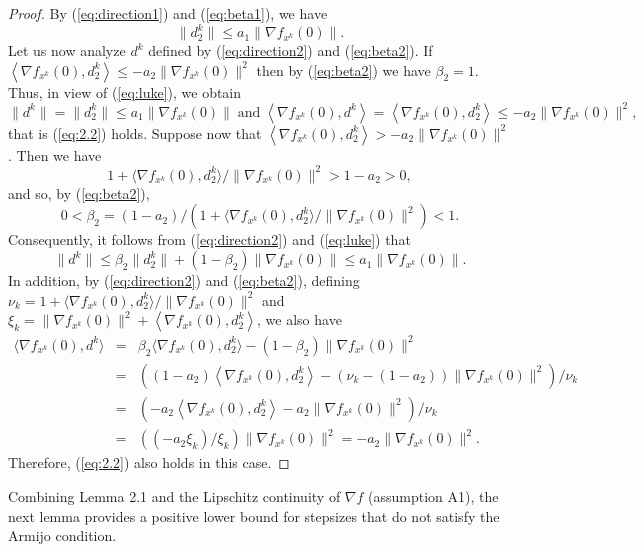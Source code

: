 \documentclass[11pt]{article}
\begin{document}
\begin{proof}
By (\ref{eq:direction1}) and (\ref{eq:beta1}), we have
\begin{equation} \label{eq:luke}
\|d_{2}^{k}\|\leq a_{1}\|\nabla f_{x^{k}}(0)\|.
\end{equation}
Let us now analyze $d^{k}$ defined by (\ref{eq:direction2}) and (\ref{eq:beta2}). If $\left\langle\nabla f_{x^{k}}(0),d_{2}^{k}\right\rangle\leq-a_{2}\|\nabla f_{x^{k}}(0)\|^{2}$ then by (\ref{eq:beta2}) we have $\beta_{2}=1$. Thus, in view of (\ref{eq:luke}), we obtain
\[
\|d^{k}\|=\|d_{2}^{k}\|\leq a_{1}\|\nabla f_{x^{k}}(0)\|\;\text{and}\;\left\langle\nabla f_{x^{k}}(0),d^{k}\right\rangle=\left\langle\nabla f_{x^{k}}(0),d_{2}^{k}\right\rangle\leq -a_{2}\|\nabla f_{x^{k}}(0)\|^{2},
\]
that is (\ref{eq:2.2}) holds. Suppose now that $\left\langle\nabla f_{x^{k}}(0),d_{2}^{k}\right\rangle>-a_{2}\|\nabla f_{x^{k}}(0)\|^{2}$. Then we have
\[
1 + \langle \nabla f_{x^{k}}(0),d_{2}^{k} \rangle / \| \nabla f_{x^{k}}(0) \|^{2} > 1 - a_{2} > 0,
\]
and so, by (\ref{eq:beta2}), 
\[
0<\beta_{2}=(1-a_{2}) / \left(1+\langle\nabla f_{x^{k}}(0),d_{2}^{k}\rangle / \|\nabla f_{x^{k}}(0)\|^{2}\right) <1.
\]
Consequently, it follows from (\ref{eq:direction2}) and (\ref{eq:luke}) that
\[
\|d^{k}\|\leq\beta_{2}\|d_{2}^{k}\|+(1-\beta_{2})\|\nabla f_{x^{k}}(0)\|\leq a_{1}\|\nabla f_{x^{k}}(0)\|.
\]
In addition, by (\ref{eq:direction2}) and (\ref{eq:beta2}), defining $\nu_k = 1+\langle\nabla f_{x^{k}}(0),d_{2}^{k}\rangle / \|\nabla f_{x^{k}}(0)\|^{2}$ and $\xi_k = \|\nabla f_{x^{k}}(0)\|^{2}+\left\langle\nabla f_{x^{k}}(0),d_{2}^{k}\right\rangle$, we also have
\begin{eqnarray*}
\langle\nabla f_{x^{k}}(0),d^{k}\rangle
&=& \beta_{2}\langle\nabla f_{x^{k}}(0),d_{2}^{k}\rangle-(1-\beta_{2})\|\nabla f_{x^{k}}(0)\|^{2}\\
&=&\left((1-a_{2})\left\langle\nabla f_{x^{k}}(0),d_{2}^{k}\right\rangle-\left(\nu_k-(1-a_{2})\right)\|\nabla f_{x^{k}}(0)\|^{2}\right) / \nu_k\\
&=&\left(-a_{2}\left\langle\nabla f_{x^{k}}(0),d_{2}^{k}\right\rangle-a_{2}\|\nabla f_{x^{k}}(0)\|^{2}\right) / \nu_k\\
&=&\left((-a_{2} \xi_k ) / \xi_k \right) \|\nabla f_{x^{k}}(0)\|^{2} = -a_{2}\|\nabla f_{x^{k}}(0)\|^{2}.
\end{eqnarray*}
Therefore, (\ref{eq:2.2}) also holds in this case.
\end{proof}

Combining Lemma 2.1 and the Lipschitz continuity of $\nabla f$ (assumption A1), the next lemma provides a positive lower bound for stepsizes that do not satisfy the Armijo condition.
\end{document}
